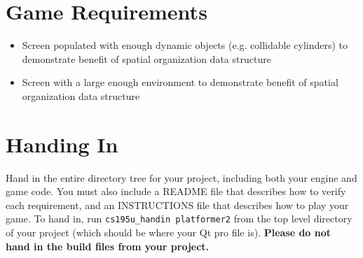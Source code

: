 \documentclass{../cs195u}
\begin{document}
 \section*{Game Requirements}
  \begin{itemize}
    \item Screen populated with enough dynamic objects (e.g. collidable cylinders) to demonstrate benefit of spatial organization data structure
    \item Screen with a large enough environment to demonstrate benefit of spatial organization data structure
   \end{itemize}

 \section*{Handing In}
Hand in the entire directory tree for your project, including both your engine and game code. You must also include a README file that describes how to verify each requirement, and an INSTRUCTIONS file that describes how to play your game. To hand in, run \texttt{cs195u\_handin platformer2} from the top level directory of your project (which should be where your Qt pro file is). \textbf{Please do not hand in the build files from your project.}
\end{document}
